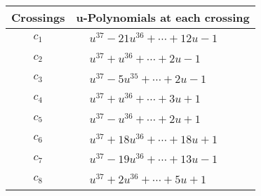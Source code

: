 \documentclass[1p]{elsarticle_modified}
\theoremstyle{definition}
\begin{document}
\begin{tabular}{m{50pt}|m{274pt}}
Crossings & \hspace{64pt}u-Polynomials at each crossing \\
\hline $$\begin{aligned}c_{1}\end{aligned}$$&$\begin{aligned}
&u^{37}-21 u^{36}+\cdots+12 u-1
\end{aligned}$\\
\hline $$\begin{aligned}c_{2}\end{aligned}$$&$\begin{aligned}
&u^{37}+u^{36}+\cdots+2 u-1
\end{aligned}$\\
\hline $$\begin{aligned}c_{3}\end{aligned}$$&$\begin{aligned}
&u^{37}-5 u^{35}+\cdots+2 u-1
\end{aligned}$\\
\hline $$\begin{aligned}c_{4}\end{aligned}$$&$\begin{aligned}
&u^{37}+u^{36}+\cdots+3 u+1
\end{aligned}$\\
\hline $$\begin{aligned}c_{5}\end{aligned}$$&$\begin{aligned}
&u^{37}- u^{36}+\cdots+2 u+1
\end{aligned}$\\
\hline $$\begin{aligned}c_{6}\end{aligned}$$&$\begin{aligned}
&u^{37}+18 u^{36}+\cdots+18 u+1
\end{aligned}$\\
\hline $$\begin{aligned}c_{7}\end{aligned}$$&$\begin{aligned}
&u^{37}-19 u^{36}+\cdots+13 u-1
\end{aligned}$\\
\hline $$\begin{aligned}c_{8}\end{aligned}$$&$\begin{aligned}
&u^{37}+2 u^{36}+\cdots+5 u+1
\end{aligned}$\\

\end{tabular}
\end{document}
